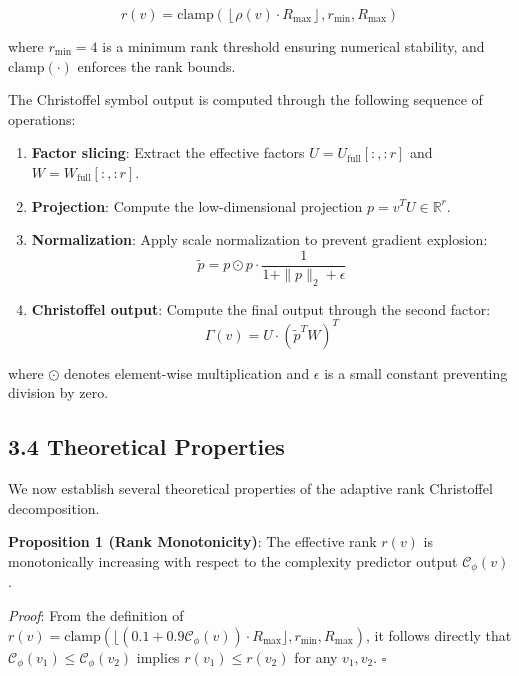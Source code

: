 \documentclass[12pt]{article}
\begin{document}
\begin{equation}
r(v) = \text{clamp}\left( \left\lfloor \rho(v) \cdot R_{\max} \right\rfloor, r_{\min}, R_{\max} \right)
\end{equation}

where $r_{\min} = 4$ is a minimum rank threshold ensuring numerical stability, and $\text{clamp}(\cdot)$ enforces the rank bounds.

The Christoffel symbol output is computed through the following sequence of operations:

\begin{enumerate}[label=\arabic*.]
\item \textbf{Factor slicing}: Extract the effective factors $U = U_{\text{full}}[:, :r]$ and $W = W_{\text{full}}[:, :r]$.
\item \textbf{Projection}: Compute the low-dimensional projection $p = v^T U \in \mathbb{R}^r$.
\item \textbf{Normalization}: Apply scale normalization to prevent gradient explosion:
\begin{equation}
\tilde{p} = p \odot p \cdot \frac{1}{1 + \|p\|_2 + \epsilon}
\end{equation}
\item \textbf{Christoffel output}: Compute the final output through the second factor:
\begin{equation}
\Gamma(v) = U \cdot \left( \tilde{p}^T W \right)^T
\end{equation}
\end{enumerate}

where $\odot$ denotes element-wise multiplication and $\epsilon$ is a small constant preventing division by zero.

\subsection{3.4 Theoretical Properties}

We now establish several theoretical properties of the adaptive rank Christoffel decomposition.

\textbf{Proposition 1 (Rank Monotonicity)}: The effective rank $r(v)$ is monotonically increasing with respect to the complexity predictor output $\mathcal{C}_\phi(v)$.

\textit{Proof}: From the definition of $r(v) = \text{clamp}(\lfloor(0.1 + 0.9\mathcal{C}_\phi(v)) \cdot R_{\max}\rfloor, r_{\min}, R_{\max})$, it follows directly that $\mathcal{C}_\phi(v_1) \leq \mathcal{C}_\phi(v_2)$ implies $r(v_1) \leq r(v_2)$ for any $v_1, v_2$. $\square$
\end{document}
